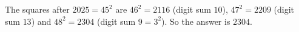 The squares after $2025=45^2$ are $46^2=2116$ (digit sum $10$), $47^2=2209$ (digit sum $13$) and $48^2=2304$ (digit sum $9=3^2$). So the answer is $\boxed{2304}$.
